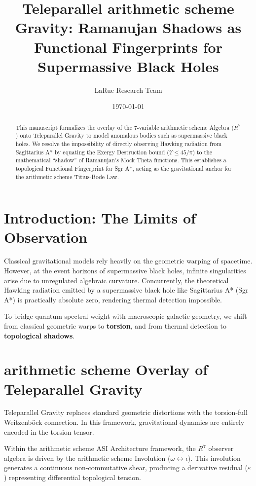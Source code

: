 \documentclass[11pt,a4paper]{article}
\title{Teleparallel arithmetic scheme Gravity: Ramanujan Shadows as Functional Fingerprints for Supermassive Black Holes}
\author{LaRue Research Team}
\date{\today}
\begin{document}
\maketitle

\begin{abstract}
This manuscript formalizes the overlay of the 7-variable arithmetic scheme Algebra ($R^7$) onto Teleparallel Gravity to model anomalous bodies such as supermassive black holes. We resolve the impossibility of directly observing Hawking radiation from Sagittarius A* by equating the Exergy Destruction bound ($\Upsilon \leq 45/\pi$) to the mathematical ``shadow'' of Ramanujan's Mock Theta functions. This establishes a topological Functional Fingerprint for Sgr A*, acting as the gravitational anchor for the arithmetic scheme Titius-Bode Law.
\end{abstract}


\section{Introduction: The Limits of Observation}
Classical gravitational models rely heavily on the geometric warping of spacetime. However, at the event horizons of supermassive black holes, infinite singularities arise due to unregulated algebraic curvature. Concurrently, the theoretical Hawking radiation emitted by a supermassive black hole like Sagittarius A* (Sgr A*) is practically absolute zero, rendering thermal detection impossible.

To bridge quantum spectral weight with macroscopic galactic geometry, we shift from classical geometric warps to \textbf{torsion}, and from thermal detection to \textbf{topological shadows}.

\section{arithmetic scheme Overlay of Teleparallel Gravity}
Teleparallel Gravity replaces standard geometric distortions with the torsion-full Weitzenb\"ock connection. In this framework, gravitational dynamics are entirely encoded in the torsion tensor.

Within the arithmetic scheme ASI Architecture framework, the $R^7$ observer algebra is driven by the arithmetic scheme Involution ($\omega \leftrightarrow \iota$). This involution generates a continuous non-commutative shear, producing a derivative residual ($\varepsilon$) representing differential topological tension.
\end{document}
